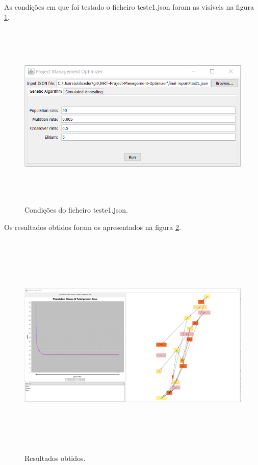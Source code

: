 \begin{titlepage}
As condições em que foi testado o ficheiro teste1.json foram as visíveis na figura \ref{teste1}. 

\begin{figure}[H]
  \centering
    \includegraphics[width=14cm, height = 9cm]{test1.png}
  \caption{Condições do ficheiro teste1.json.}
  \label{teste1}
\end{figure}

Os resultados obtidos foram os apresentados na figura \ref{exp1}.

\begin{figure}[H]
  \centering
    \includegraphics[width=19cm, height = 11cm]{exp1.png}
  \caption{Resultados obtidos.}
  \label{exp1}
\end{figure}


\end{titlepage}
